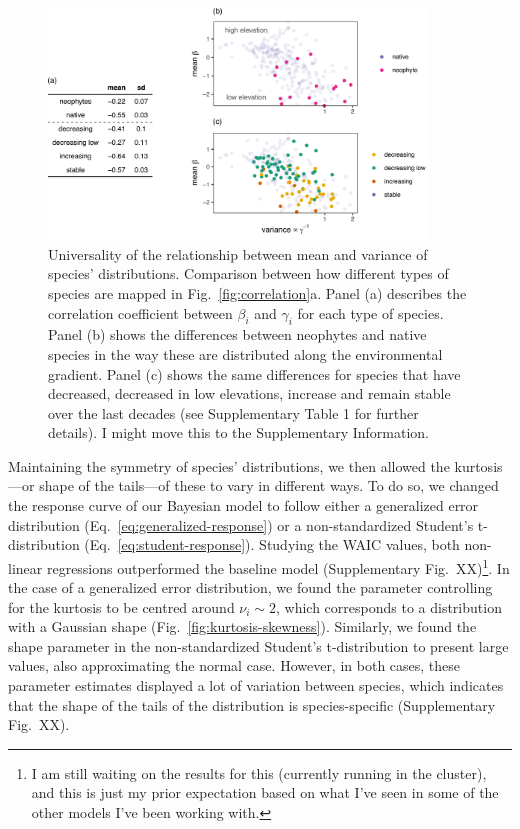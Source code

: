\documentclass[11pt, a4paper]{article}
\begin{document}
\begin{figure}[ht]
  \centering
    \vspace{0.5cm}
    \includegraphics[width=0.9\textwidth]{figures/means-Rapopor}
    	  \vspace{0.3cm}
	   \caption{Universality of the relationship between mean and variance of species' distributions. Comparison between how different types of species are mapped in Fig.~\ref{fig:correlation}a. Panel (a) describes the correlation coefficient between $\beta_i$ and $\gamma_i$ for each type of species. Panel (b) shows the differences between neophytes and native species in the way these are distributed along the environmental gradient. Panel (c) shows the same differences for species that have decreased, decreased in low elevations, increase and remain stable over the last decades (see Supplementary Table 1 for further details). {\color{red} I might move this to the Supplementary Information.}}
      \label{fig:universality}
\end{figure}

Maintaining the symmetry of species' distributions, we then allowed the kurtosis---or shape of the tails---of these to vary in different ways. To do so, we changed the response curve of our Bayesian model to follow either a generalized error distribution (Eq.~\ref{eq:generalized-response}) or a non-standardized Student's t-distribution (Eq.~\ref{eq:student-response}). Studying the WAIC values, both non-linear regressions outperformed the baseline model (Supplementary Fig.~XX)\footnote[2]{\label{note1} I am still waiting on the results for this (currently running in the cluster), and this is just my prior expectation based on what I've seen in some of the other models I've been working with.}. In the case of a generalized error distribution, we found the parameter controlling for the kurtosis to be centred around $\nu_i \sim 2$, which corresponds to a distribution with a Gaussian shape (Fig.~\ref{fig:kurtosis-skewness}). Similarly, we found the shape parameter in the non-standardized Student's t-distribution to present large values, also approximating the normal case. However, in both cases, these parameter estimates displayed a lot of variation between species, which indicates that the shape of the tails of the distribution is species-specific (Supplementary Fig.~XX).
\end{document}
